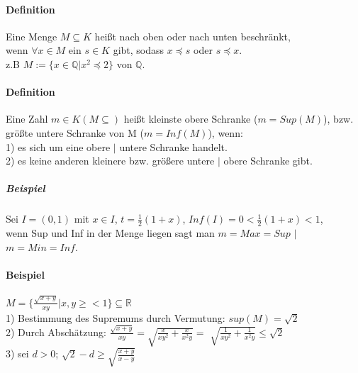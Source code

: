 \documentclass[10pt,a4paper,draft]{scrartcl}
\begin{document}
\paragraph*{Definition}
\begin{tabbing}
Eine Menge $M\subseteq K$ heißt nach oben oder nach unten beschränkt,\\ wenn $\forall x\in M$ ein $s\in K$ gibt, sodass $x\preceq s$ oder $s\preceq x$.\\
z.B $M:=\{x\in \mathbb{Q} | x^{2}\preceq 2\}$ von $\mathbb{Q}$.\\
\end{tabbing}

\paragraph*{Definition}
\begin{tabbing}
Eine Zahl $m\in K (M\subseteq)$ heißt kleinste obere Schranke ($m = Sup(M)$), bzw. größte untere Schranke von M ($m = Inf(M)$), wenn:\\
1) es sich um eine obere $|$ untere Schranke handelt.\\
2) es keine anderen kleinere bzw. größere untere $|$ obere Schranke gibt.\\
\end{tabbing}

\subparagraph*{Beispiel} 
\begin{tabbing}
Sei $I = (0,1)$ mit $x\in I$, $t =\frac{1}{2} (1+x)$, $Inf(I) = 0 <\frac{1}{2} (1+x) < 1$,\\
wenn Sup und Inf in der Menge liegen sagt man $m = Max = Sup$ $|$ $m = Min = Inf$.
\end{tabbing}

\paragraph*{Beispiel}
\begin{tabbing}
 $M =\{\frac{\sqrt{x + y}}{xy} | x,y\geq < 1\}\subseteq \mathbb{R}$\\
 1) Bestimmung des Supremums durch Vermutung: $sup(M) = \sqrt{2}$\\
 2) Durch Abschätzung: $\frac{\sqrt{x+y}}{xy} = \sqrt{\frac{x}{xy^{2}} + \frac{x}{x^{2}y}} = $
 	$\sqrt{\frac{1}{xy^{2}} + \frac{1}{x^{2}y}} \leq \sqrt{2}$\\
 3)	sei $d > 0$; $\sqrt{2} - d\geq \sqrt{\frac{x + y}{x - y}}$\\
\end{tabbing}
\end{document}

